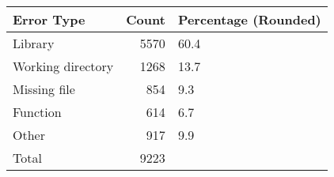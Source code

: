 \begin{tabular}{lrl}
\toprule
       Error Type &  Count & Percentage (Rounded) \\
\midrule
          Library &   5570 &                 60.4 \\
Working directory &   1268 &                 13.7 \\
     Missing file &    854 &                  9.3 \\
         Function &    614 &                  6.7 \\
            Other &    917 &                  9.9 \\
            Total &   9223 &                      \\
\bottomrule
\end{tabular}
